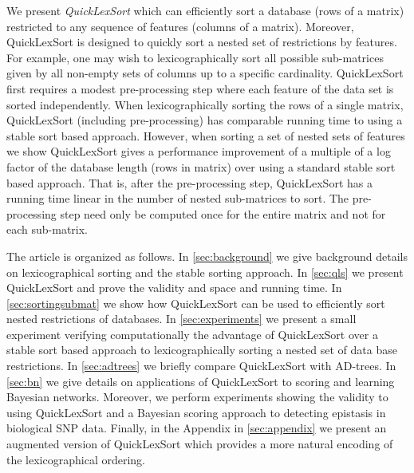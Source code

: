 \documentclass[a4paper,10pt,reqno]{amsart}
\theoremstyle{definition}
\begin{document}
We present \emph{QuickLexSort} which can efficiently sort a database (rows of a
matrix) restricted to any sequence of features (columns of a matrix). Moreover,
QuickLexSort is designed to quickly sort a nested set of restrictions by
features. For example, one may wish to lexicographically sort all possible
sub-matrices given by all non-empty sets of columns up to a specific
cardinality. QuickLexSort first requires a modest pre-processing step where
each feature of the data set is sorted independently.  When lexicographically
sorting the rows of a single matrix, QuickLexSort (including pre-processing)
has comparable running time to using a stable sort based approach.  However,
when sorting a set of nested sets of features we show QuickLexSort gives a
performance improvement of a multiple of a log factor of the database length
(rows in matrix) over using a standard stable sort based approach. That is,
after the pre-processing step, QuickLexSort has a running time linear in the
number of nested sub-matrices to sort. The pre-processing step need only be
computed once for the entire matrix and not for each sub-matrix. 

The article is organized as follows. In \autoref{sec:background} we
give background details on lexicographical sorting and the stable sorting
approach. In \autoref{sec:qls} we present QuickLexSort and prove the validity and space and
running time. In \autoref{sec:sortingsubmat} we show how
QuickLexSort can be used to efficiently sort nested restrictions of databases.
In \autoref{sec:experiments} we present a small experiment verifying
computationally the advantage of QuickLexSort over a stable sort based approach
to lexicographically sorting a nested set of data base restrictions. In
\autoref{sec:adtrees} we briefly compare QuickLexSort with AD-trees. In
\autoref{sec:bn} we give details on applications of QuickLexSort to scoring and
learning Bayesian networks.  Moreover, we perform experiments showing the
validity to using QuickLexSort and a Bayesian scoring approach to detecting
epistasis in biological SNP data.  Finally, in the Appendix in \autoref{sec:appendix} we
present an augmented version of QuickLexSort which provides a more natural
encoding of the lexicographical ordering.
\end{document}
